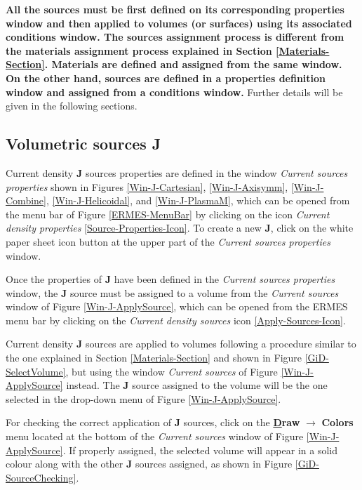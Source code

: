 \textbf{All the sources must be first defined on its corresponding properties window and then applied to volumes (or surfaces) using its associated conditions window. The sources assignment process is different from the materials assignment process explained in Section \ref{Materials-Section}. Materials are defined and assigned from the same window. On the other hand, sources are defined in a properties definition window and assigned from a conditions window.} Further details will be given in the following sections.

\subsection{Volumetric sources J}

Current density \textbf{J} sources properties are defined in the window \textit{Current sources properties} shown in Figures \ref{Win-J-Cartesian}, \ref{Win-J-Axisymm}, \ref{Win-J-Combine}, \ref{Win-J-Helicoidal}, and \ref{Win-J-PlasmaM}, which can be opened from the menu bar of Figure \ref{ERMES-MenuBar} by clicking on the icon \textit{Current density properties} \ref{Source-Properties-Icon}. To create a new \textbf{J}, click on the white paper sheet icon button at the upper part of the \textit{Current sources properties} window.

Once the properties of \textbf{J} have been defined in the \textit{Current sources properties} window, the \textbf{J} source must be assigned to a volume from the \textit{Current sources} window of Figure \ref{Win-J-ApplySource}, which can be opened from the ERMES menu bar by clicking on the \textit{Current density sources} icon \ref{Apply-Sources-Icon}. 

Current density \textbf{J} sources are applied to volumes following a procedure similar to the one explained in Section \ref{Materials-Section} and shown in Figure \ref{GiD-SelectVolume}, but using the window \textit{Current sources} of Figure \ref{Win-J-ApplySource} instead. The \textbf{J} source assigned to the volume will be the one selected in the drop-down menu of Figure \ref{Win-J-ApplySource}.

For checking the correct application of \textbf{J} sources, click on the  \textbf{\underline{D}raw} $\rightarrow$ \textbf{Colors} menu located at the bottom of the \textit{Current sources} window of Figure \ref{Win-J-ApplySource}. If properly assigned, the selected volume will appear in a solid colour along with the other \textbf{J} sources assigned, as shown in Figure \ref{GiD-SourceChecking}. 

